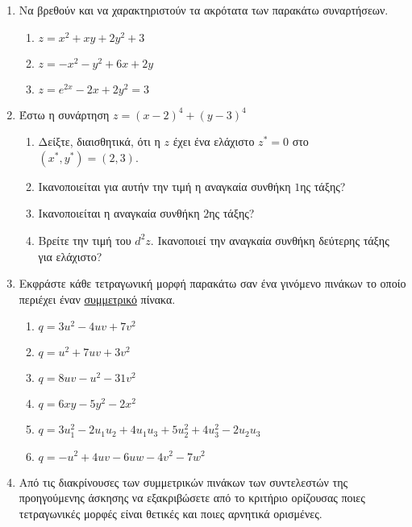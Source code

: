 \documentclass[a4paper,12pt]{article}
\begin{document}
\begin{center}
\end{center}

\vspace{2\baselineskip}

\begin{enumerate}
\item Να βρεθούν και να χαρακτηριστούν τα ακρότατα των παρακάτω συναρτήσεων.
\begin{enumerate}
\item $z=x^2+xy+2y^2+3$
\item $z=-x^2-y^2+6x+2y$
\item $z=e^{2x}-2x+2y^2=3$
\end{enumerate}

\item Έστω η συνάρτηση $z=(x-2)^4+(y-3)^4$
\begin{enumerate}

\item Δείξτε, διαισθητικά, ότι η $z$ έχει ένα ελάχιστο $z^*=0$ στο $(x^*,y^*)=(2,3)$.
\item Ικανοποιείται για αυτήν την τιμή η αναγκαία συνθήκη $1$ης τάξης?
\item Ικανοποιείται η αναγκαία συνθήκη $2$ης τάξης?
\item Βρείτε την τιμή του $d^2z$. Ικανοποιεί την αναγκαία συνθήκη δεύτερης τάξης για ελάχιστο?
\end{enumerate}

\item Εκφράστε κάθε τετραγωνική μορφή παρακάτω σαν ένα γινόμενο πινάκων το οποίο περιέχει έναν \underline{συμμετρικό} πίνακα.

\begin{enumerate}
\item $q=3u^2-4uv+7v^2$
\item $q=u^2+7uv+3v^2$
\item $q=8uv-u^2-31v^2$
\item $q=6xy-5y^2-2x^2$
\item $q=3u_1^2-2u_1u_2+4u_1u_3+5u_2^2+4u_3^2-2u_2u_3$
\item $q=-u^2+4uv-6uw-4v^2-7w^2$
\end{enumerate}

\item Από τις διακρίνουσες των συμμετρικών πινάκων των συντελεστών της προηγούμενης άσκησης να εξακριβώσετε από το κριτήριο ορίζουσας ποιες τετραγωνικές μορφές είναι θετικές και ποιες αρνητικά ορισμένες.


\end{enumerate}
\end{document}
